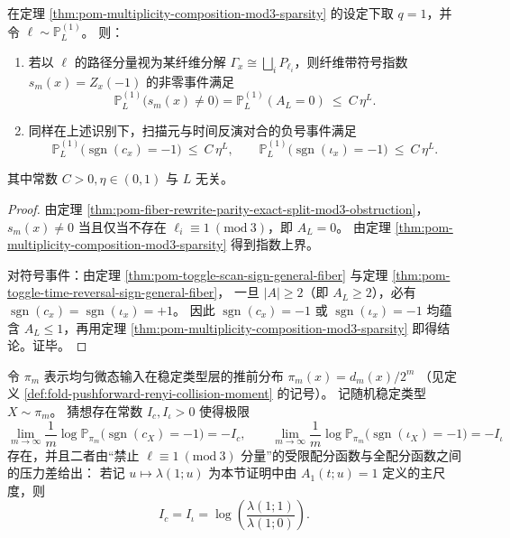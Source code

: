 \begin{corollary}\label{cor:pom-multiplicity-composition-witten-sign-exp-sparse}
在定理 \ref{thm:pom-multiplicity-composition-mod3-sparsity} 的设定下取 \(q=1\)，并令 \(\boldsymbol{\ell}\sim\mathbb P^{(1)}_L\)。
则：
\begin{enumerate}
  \item 若以 \(\boldsymbol{\ell}\) 的路径分量视为某纤维分解 \(\Gamma_x\cong\bigsqcup_i P_{\ell_i}\)，则纤维带符号指数 \(s_m(x)=Z_x(-1)\) 的非零事件满足
  \[
  \mathbb P^{(1)}_L\!\bigl(s_m(x)\neq 0\bigr)=\mathbb P^{(1)}_L(A_L=0)\ \le\ C\,\eta^L.
  \]
  \item 同样在上述识别下，扫描元与时间反演对合的负号事件满足
  \[
  \mathbb P^{(1)}_L\!\bigl(\operatorname{sgn}(c_x)=-1\bigr)\ \le\ C\,\eta^L,
  \qquad
  \mathbb P^{(1)}_L\!\bigl(\operatorname{sgn}(\iota_x)=-1\bigr)\ \le\ C\,\eta^L.
\]
\end{enumerate}
其中常数 \(C>0,\eta\in(0,1)\) 与 \(L\) 无关。
\end{corollary}
\begin{proof}
由定理 \ref{thm:pom-fiber-rewrite-parity-exact-split-mod3-obstruction}，
\(
s_m(x)\neq 0
\)
当且仅当不存在 \(\ell_i\equiv 1\ (\mathrm{mod}\ 3)\)，即 \(A_L=0\)。
由定理 \ref{thm:pom-multiplicity-composition-mod3-sparsity} 得到指数上界。
\par
对符号事件：由定理 \ref{thm:pom-toggle-scan-sign-general-fiber} 与定理 \ref{thm:pom-toggle-time-reversal-sign-general-fiber}，
一旦 \(|A|\ge 2\)（即 \(A_L\ge 2\)），必有 \(\operatorname{sgn}(c_x)=\operatorname{sgn}(\iota_x)=+1\)。
因此 \(\operatorname{sgn}(c_x)=-1\) 或 \(\operatorname{sgn}(\iota_x)=-1\) 均蕴含 \(A_L\le 1\)，再用定理 \ref{thm:pom-multiplicity-composition-mod3-sparsity} 即得结论。证毕。
\end{proof}

\begin{conjecture}\label{conj:pom-chi-anom-rate-free-energy-gap}
令 \(\pi_m\) 表示均匀微态输入在稳定类型层的推前分布
\(
\pi_m(x)=d_m(x)/2^m
\)
（见定义 \ref{def:fold-pushforward-renyi-collision-moment} 的记号）。
记随机稳定类型 \(X\sim \pi_m\)。
猜想存在常数 \(I_c,I_\iota>0\) 使得极限
\[
\lim_{m\to\infty}\frac1m\log \mathbb P_{\pi_m}\bigl(\operatorname{sgn}(c_X)=-1\bigr)=-I_c,
\qquad
\lim_{m\to\infty}\frac1m\log \mathbb P_{\pi_m}\bigl(\operatorname{sgn}(\iota_X)=-1\bigr)=-I_\iota
\]
存在，并且二者由“禁止 \(\ell\equiv 1\ (\mathrm{mod}\ 3)\) 分量”的受限配分函数与全配分函数之间的压力差给出：
若记 \(u\mapsto \lambda(1;u)\) 为本节证明中由 \(A_1(t;u)=1\) 定义的主尺度，则
\[
I_c=I_\iota=\log\!\left(\frac{\lambda(1;1)}{\lambda(1;0)}\right).
\]
\end{conjecture}

\endinput
